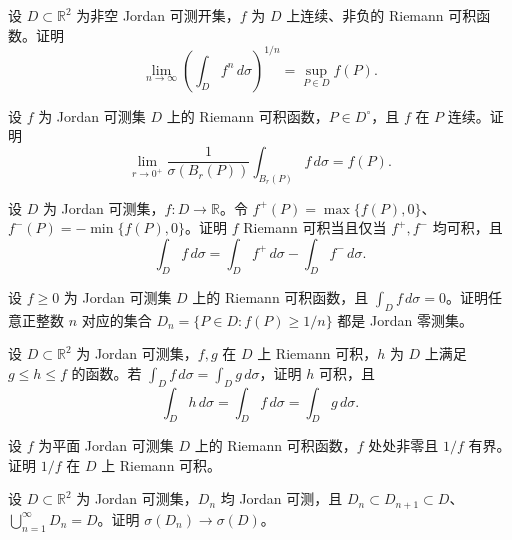 \newpage
\noindent\begin{minipage}{\textwidth}
设 $D\subset\mathbb R^2$ 为非空 Jordan 可测开集，$f$ 为 $D$ 上连续、非负的 Riemann 可积函数。证明\[\lim_{n\to\infty}\left(\int_D f^n\,d\sigma\right)^{1/n}=\sup_{P\in D}f(P).\]
\end{minipage}\par\vfill
\noindent\begin{minipage}{\textwidth}
设 $f$ 为 Jordan 可测集 $D$ 上的 Riemann 可积函数，$P\in D^\circ$，且 $f$ 在 $P$ 连续。证明\[\lim_{r\to0^+}\frac1{\sigma(B_r(P))}\int_{B_r(P)}f\,d\sigma=f(P).\]
\end{minipage}\par\vfill
\noindent\begin{minipage}{\textwidth}
设 $D$ 为 Jordan 可测集，$f:D\to\mathbb R$。令 $f^+(P)=\max\{f(P),0\}$、$f^-(P)=-\min\{f(P),0\}$。证明 $f$ Riemann 可积当且仅当 $f^+,f^-$ 均可积，且\[\int_D f\,d\sigma=\int_D f^+\,d\sigma-\int_D f^-\,d\sigma.\]
\end{minipage}\par\vfill
\noindent\begin{minipage}{\textwidth}
设 $f\ge0$ 为 Jordan 可测集 $D$ 上的 Riemann 可积函数，且 $\int_D f\,d\sigma=0$。证明任意正整数 $n$ 对应的集合 $D_n=\{P\in D:f(P)\ge1/n\}$ 都是 Jordan 零测集。
\end{minipage}\par\vfill
\newpage
\noindent\begin{minipage}{\textwidth}
设 $D\subset\mathbb R^2$ 为 Jordan 可测集，$f,g$ 在 $D$ 上 Riemann 可积，$h$ 为 $D$ 上满足 $g\le h\le f$ 的函数。若 $\int_D f\,d\sigma=\int_D g\,d\sigma$，证明 $h$ 可积，且\[\int_D h\,d\sigma=\int_D f\,d\sigma=\int_D g\,d\sigma.\]
\end{minipage}\par\vfill
\noindent\begin{minipage}{\textwidth}
设 $f$ 为平面 Jordan 可测集 $D$ 上的 Riemann 可积函数，$f$ 处处非零且 $1/f$ 有界。证明 $1/f$ 在 $D$ 上 Riemann 可积。
\end{minipage}\par\vfill
\noindent\begin{minipage}{\textwidth}
设 $D\subset\mathbb R^2$ 为 Jordan 可测集，$D_n$ 均 Jordan 可测，且 $D_n\subset D_{n+1}\subset D$、$\bigcup_{n=1}^{\infty}D_n=D$。证明 $\sigma(D_n)\to\sigma(D)$。
\end{minipage}\par\vfill

